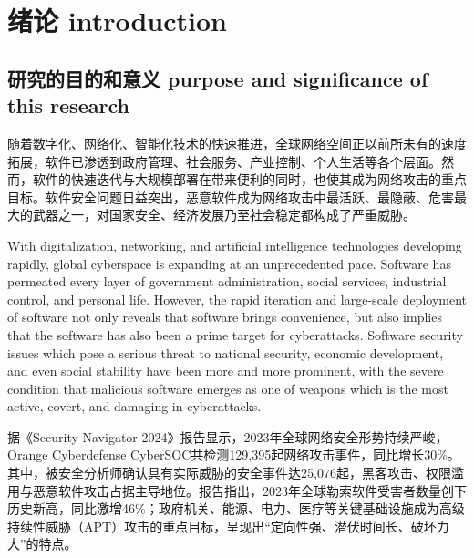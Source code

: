 %
%
%
%
\chapter{绪论 introduction}

\label{chap:intro}
\section{研究的目的和意义 purpose and significance of this research}

随着数字化、网络化、智能化技术的快速推进，全球网络空间正以前所未有的速度拓展，软件已渗透到政府管理、社会服务、产业控制、个人生活等各个层面。然而，软件的快速迭代与大规模部署在带来便利的同时，也使其成为网络攻击的重点目标。软件安全问题日益突出，恶意软件成为网络攻击中最活跃、最隐蔽、危害最大的武器之一，对国家安全、经济发展乃至社会稳定都构成了严重威胁。

With digitalization, networking, and artificial intelligence technologies developing rapidly, global cyberspace is expanding at an unprecedented pace. Software has permeated every layer of government administration, social services, industrial control, and personal life. However, the rapid iteration and large-scale deployment of software not only reveals that software brings convenience, but also implies that the software has also been a prime target for cyberattacks. Software security issues which pose a serious threat to national security, economic development, and even social stability have been more and more prominent, with the severe condition that malicious software emerges as one of weapons which is the most active, covert, and damaging in cyberattacks.

据《Security Navigator 2024》报告显示，2023年全球网络安全形势持续严峻，Orange Cyberdefense CyberSOC共检测129,395起网络攻击事件，同比增长30\%。其中，被安全分析师确认具有实际威胁的安全事件达25,076起，黑客攻击、权限滥用与恶意软件攻击占据主导地位。报告指出，2023年全球勒索软件受害者数量创下历史新高，同比激增46\%；政府机关、能源、电力、医疗等关键基础设施成为高级持续性威胁（APT）攻击的重点目标，呈现出“定向性强、潜伏时间长、破坏力大”的特点\cite{securitynavigator2024}。


